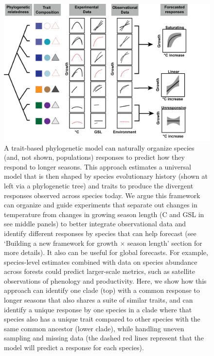 \documentclass[11pt]{article}
\begin{document}
\clearpage
\begin{figure}[h!]
\includegraphics[width=1\textwidth]{..//figures/phylomodel/phylomodel.png}
\caption{A trait-based phylogenetic model can naturally organize species (and, not shown, populations) responses to predict how they respond to longer seasons. This approach estimates a universal model that is then shaped by species evolutionary history (shown at left via a phylogenetic tree) and traits to produce the divergent responses observed across species today. We argue this framework can organize and guide experiments that separate out changes in temperature from changes in growing season length (\degree C and GSL in see middle panels) to better integrate observational data and identify different responses by species that can help forecast (see `Building a new framework for growth $\times$ season length' section for more details). It also can be useful for global forecasts. For example, species-level estimates combined with data on species abundance across forests \citep[e.g.][]{FIA,fischer2019swiss} could predict larger-scale metrics, such as satellite observations of phenology and productivity. Here, we show how this approach can identify one clade (top) with a common response to longer seasons that also shares a suite of similar traits, and can identify a unique response by one species in a clade where that species also has a unique trait compared to other species with the same common ancestor (lower clade), while handling uneven sampling and missing data (the dashed red lines represent that the model will predict a response for each species). }  %
\label{fig:phylomodel}
\end{figure}
\end{document}
